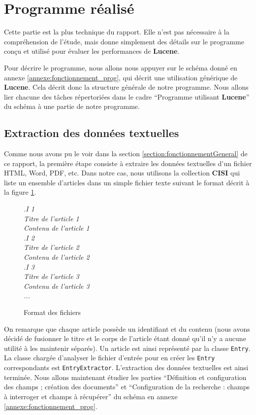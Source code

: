 \section{Programme réalisé}

Cette partie est la plus technique du rapport. Elle n’est pas nécessaire à la compréhension de l’étude, mais donne simplement des détails sur le programme conçu et utilisé pour évaluer les performances de \textbf{Lucene}.

Pour décrire le programme, nous allons nous appuyer sur le schéma donné en annexe \ref{annexe:fonctionnement_prog}, qui décrit une utilisation générique de \textbf{Lucene}. Cela décrit donc la structure générale de notre programme. Nous allons lier chacune des tâches répertoriées dans le cadre “Programme utilisant \textbf{Lucene}” du schéma à une partie de notre programme.

\subsection{Extraction des données textuelles}

Comme nous avons pu le voir dans la section \ref{section:fonctionnementGeneral} de ce rapport, la première étape consiste à extraire les données textuelles d’un fichier HTML, Word, PDF, etc. Dans notre cas, nous utilisons la collection \textbf{CISI} qui liste un ensemble d’articles dans un simple fichier texte suivant le format décrit à la figure \ref{formatTexte}.


 \begin{figure}[h]
 \textsl{
  {\selectfont
   .I 1\\
   Titre de l’article 1\\
   Contenu de l’article 1\\
   .I 2\\
   Titre de l’article 2\\
   Contenu de l’article 2\\
   .I 3\\
   Titre de l’article 3\\
   Contenu de l’article 3\\
   ...
  }
 }
            \caption{Format des fichiers}
            \label{formatTexte}
 \end{figure}

On remarque que chaque article possède un identifiant et du contenu (nous avons décidé de fusionner le titre et le corps de l’article étant donné qu’il n’y a aucune utilité à les maintenir séparés). Un article est ainsi représenté par la classe \texttt{Entry}. La classe chargée d’analyser le fichier d’entrée pour en créer les \texttt{Entry} correspondants est \texttt{EntryExtractor}.
L’extraction des données textuelles est ainsi terminée. Nous allons maintenant étudier les parties “Définition et configuration des champs ; création des documents” et “Configuration de la recherche : champs à interroger et champs à récupérer” du schéma en annexe \ref{annexe:fonctionnement_prog}.

